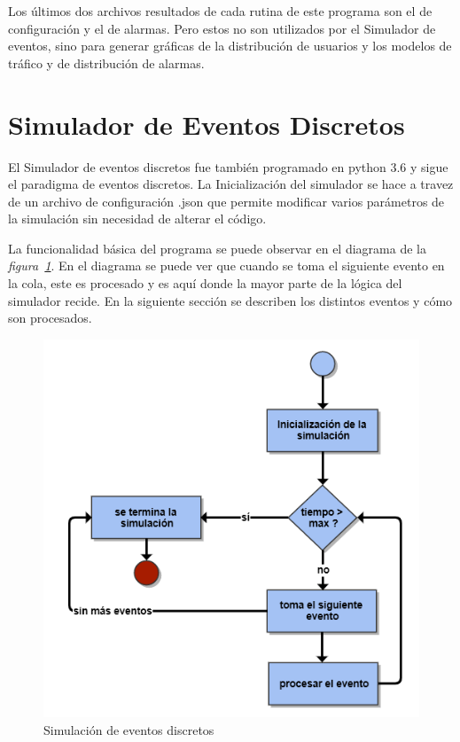 Los últimos dos archivos resultados de cada rutina de este programa son el de configuración y el de alarmas. Pero estos no son utilizados por el Simulador de eventos, sino para generar gráficas de la distribución de usuarios y los modelos de tráfico y de distribución de alarmas.\newline

\hfill

\break



\section{Simulador de Eventos Discretos}

El Simulador de eventos discretos fue también programado en python 3.6 y sigue el paradigma de eventos discretos. La Inicialización del simulador se hace a travez de un archivo de configuración .json que permite modificar varios parámetros de la simulación sin necesidad de alterar el código.\newline

La funcionalidad básica del programa se puede observar en el diagrama de la \textit{figura~\ref{fig:flowdes}}. En el diagrama se puede ver que cuando se toma el siguiente evento en la cola, este es procesado y es aquí donde la mayor parte de la lógica del simulador recide. En la siguiente sección se describen los distintos eventos y cómo son procesados.\newline

\begin{figure}[th]
    \centering
    \includegraphics[scale=.7]{Figures/flowdes.png}
    \decoRule
    \caption[Simulación de eventos discretos]{Simulación de eventos discretos}
    \label{fig:flowdes}
\end{figure}

